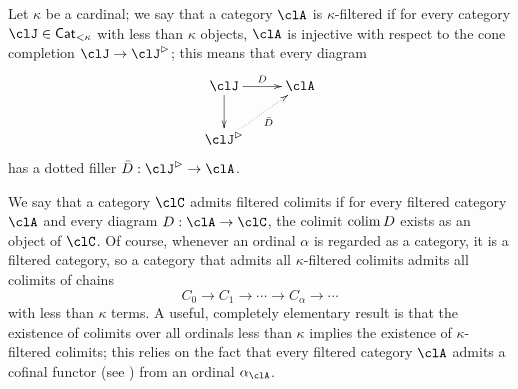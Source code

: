 Let $\kappa$ be a cardinal; we say that a category $\clA$ is $\kappa$\hyp{}filtered if for every category $\clJ\in\Cat_{<\kappa}$ with less than $\kappa$ objects, $\clA$ is injective with respect to the cone completion $\clJ\to \clJ^\rhd$; this means that every diagram
\[
  \vcenter{\xymatrix{
      \clJ\ar[d]\ar[r]^D & \clA \\
      \clJ^\rhd\ar@{.>}[ur]_{\bar D}
    }}
\]
has a dotted filler $\bar D : \clJ^\rhd \to \clA$.

We say that a category $\clC$ admits filtered colimits if for every filtered category $\clA$ and every diagram $D : \clA \to \clC$, the colimit $\operatorname{colim} D$ exists as an object of $\clC$. Of course, whenever an ordinal $\alpha$ is regarded as a category, it is a filtered category, so a category that admits all $\kappa$\hyp{}filtered colimits admits all colimits of chains
\[
  C_0 \to C_1 \to \cdots \to C_\alpha \to\cdots
\]
with less than $\kappa$ terms. A useful, completely elementary result is that the existence of colimits over all ordinals less than $\kappa$ implies the existence of $\kappa$\hyp{}filtered colimits; this relies on the fact that every filtered category $\clA$ admits a cofinal functor (see \cite[]{Bor1}) from an ordinal $\alpha_\clA$.

